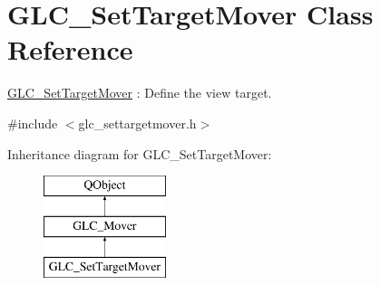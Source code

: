 \hypertarget{class_g_l_c___set_target_mover}{\section{G\-L\-C\-\_\-\-Set\-Target\-Mover Class Reference}
\label{class_g_l_c___set_target_mover}
}


\hyperlink{class_g_l_c___set_target_mover}{G\-L\-C\-\_\-\-Set\-Target\-Mover} \-: Define the view target.  




{\ttfamily \#include $<$glc\-\_\-settargetmover.\-h$>$}

Inheritance diagram for G\-L\-C\-\_\-\-Set\-Target\-Mover\-:\begin{figure}[H]
\begin{center}
\leavevmode
\includegraphics[height=3.000000cm]{class_g_l_c___set_target_mover}
\end{center}
\end{figure}
